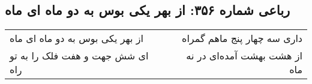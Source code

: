 \begin{center}
\section*{رباعی شماره ۳۵۶: از بهر یکی بوس به دو ماه ای ماه}
\label{sec:sh356}
\begin{longtable}{l p{0.5cm} r}
از بهر یکی بوس به دو ماه ای ماه
&&
داری سه چهار پنج ماهم گمراه
\\
ای شش جهت و هفت فلک را به تو راه
&&
از هشت بهشت آمده‌ای در نه ماه
\\
\end{longtable}
\end{center}
